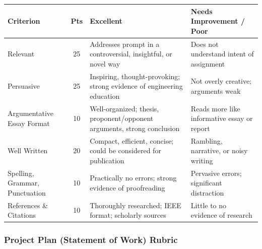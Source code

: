 {\small
\begin{longtable}{p{3.5cm} c p{4cm} p{4cm}}
\toprule
\textbf{Criterion} & \textbf{Pts} & \textbf{Excellent} & \textbf{Needs Improvement / Poor} \\
\midrule
\endfirsthead
\bottomrule
\endfoot

Relevant & 25 & Addresses prompt in a controversial, insightful, or novel way & Does not understand intent of assignment \\
\addlinespace
Persuasive & 25 & Inspiring, thought-provoking; strong evidence of engineering education & Not overly creative; arguments weak \\
\addlinespace
Argumentative Essay Format & 10 & Well-organized; thesis, proponent/opponent arguments, strong conclusion & Reads more like informative essay or report \\
\addlinespace
Well Written & 20 & Compact, efficient, concise; could be considered for publication & Rambling, narrative, or noisy writing \\
\addlinespace
Spelling, Grammar, Punctuation & 10 & Practically no errors; strong evidence of proofreading & Pervasive errors; significant distraction \\
\addlinespace
References \& Citations & 10 & Thoroughly researched; IEEE format; scholarly sources & Little to no evidence of research \\

\end{longtable}
}

\subsubsection{Project Plan (Statement of Work) Rubric}
\label{sssec:rubric-sow}

